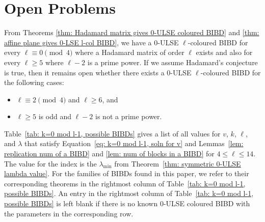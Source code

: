\documentclass[12pt]{article}
\theoremstyle{definition}
\begin{document}
\section{Open Problems}\label{sec: Open Problems}

From Theorems \ref{thm: Hadamard matrix gives 0-ULSE coloured BIBD} and \ref{thm: affine plane gives 0-LSE l-col BIBD}, we have a $0$-ULSE $\ell$-coloured BIBD for every $\ell \equiv 0 \pmod{4}$ where a Hadamard matrix of order $\ell$ exists and also for every $\ell \geq 5$ where $\ell - 2$ is a prime power. If we assume Hadamard's conjecture is true, then it remains open whether there exists a $0$-ULSE $\ell$-coloured BIBD for the following cases: 
\begin{itemize}
    \item[(i)] $\ell \equiv 2 \pmod{4}$ and $\ell \geq 6$, and
    \item[(ii)] $\ell \geq 5$ is odd and $\ell-2$ is not a prime power.
\end{itemize}

Table~\ref{tab: k=0 mod l-1, possible BIBDs} gives a list of all values for $v$, $k$, $\ell$, and $\lambda$ that satisfy Equation~\eqref{eq: k=0 mod l-1, soln for v} and Lemmas~\ref{lem: replication num of a BIBD} and \ref{lem: num of blocks in a BIBD} for $4\leq \ell \leq 14$. The value for the index is the $\lambda_{\min}$ from Theorem~\ref{thm: symmetric 0-ULSE lambda value}. For the families of BIBDs found in this paper, we refer to their corresponding theorems in the rightmost column of Table~\ref{tab: k=0 mod l-1, possible BIBDs}. An entry in the rightmost column of Table~\ref{tab: k=0 mod l-1, possible BIBDs} is left blank if there is no known $0$-ULSE coloured BIBD with the parameters in the corresponding row.
\end{document}
